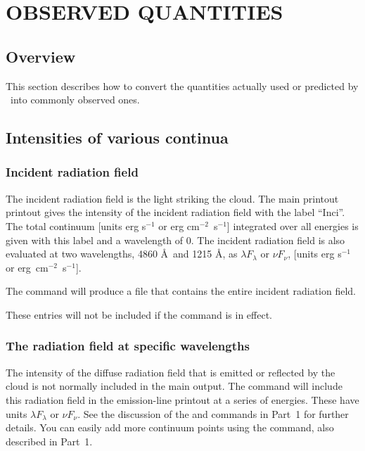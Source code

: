 \chapter{OBSERVED QUANTITIES}
\label{sec:ObservedQuantities}

\section{Overview}

This section describes how to convert the quantities actually used or
predicted by \Cloudy\ into commonly observed ones.

\section{Intensities of various continua}

\subsection{Incident radiation field}

The incident radiation field is the light striking the cloud.
The
main printout printout gives the intensity of the
incident radiation field with
the label ``Inci''.
The total continuum [units erg s$^{-1}$ or erg cm$^{-2}$~s$^{-1}$]
integrated over all energies is given with this label
and a wavelength of 0.
The incident
radiation field is also evaluated at two wavelengths,
4860 \AA\ and 1215 \AA ,
as $\lambda F_\lambda $ or $\nu F_\nu$,
[units erg s$^{-1}$ or erg~cm$^{-2}$~s$^{-1}$].

The  command will produce a file that
contains the entire incident radiation field.

These entries will not be included if the  command
is in effect.

\subsection{The radiation field at specific wavelengths}

The intensity of the diffuse radiation field that is
emitted or reflected by the cloud is not normally included in the main output.
The  command will include this radiation field
in the emission-line printout at a series of energies.  These have units
$\lambda F_\lambda $ or $\nu F_\nu$. See the discussion of the 
and  commands in Part~1 for further details.
You can easily add more continuum points using the
 command, also described in Part~1.

